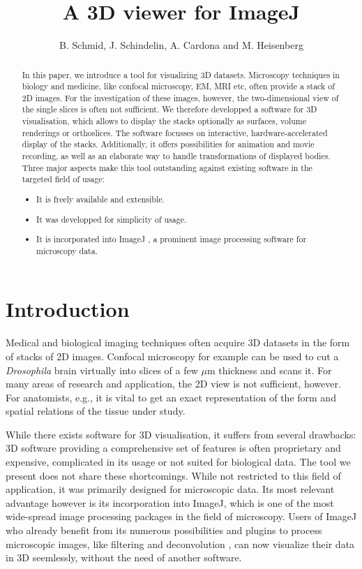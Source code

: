 \documentclass[a4paper,10pt]{article}
\title{A 3D viewer for ImageJ}
\author{B. Schmid, J. Schindelin, A. Cardona and M. Heisenberg}
\begin{document}
\maketitle
\setlength{\parskip}{0.3cm}


\begin{abstract}
In this paper, we introduce a tool for visualizing 3D datasets. Microscopy techniques in biology and medicine, like confocal microscopy, EM, MRI etc, often provide a stack of 2D images. For the investigation of these images, however, the two-dimensional view of the single slices is often not sufficient. We therefore developped a software for 3D visualisation, which allows to display the stacks optionally as surfaces, volume renderings or orthoslices. The software focusses on interactive, hardware-accelerated display of the stacks. Additionally, it offers possibilities for animation and movie recording, as well as an elaborate way to handle transformations of displayed bodies.
Three major aspects make this tool outstanding against existing software in the targeted field of usage:
\begin{itemize}
\item It is freely available and extensible.
\item It was developped for simplicity of usage.
\item It is incorporated into ImageJ \cite{imagej}, a prominent image processing software for microscopy data.
\end{itemize}
\end{abstract}




\section{Introduction}
Medical and biological imaging techniques often acquire 3D datasets in the form of stacks of 2D images. Confocal microscopy for example can be used to cut a \textit{Drosophila} brain virtually into slices of a few $\mu$m thickness and scans it. For many areas of research and application, the 2D view is not sufficient, however. For anatomists, e.g., it is vital to get an exact representation of the form and spatial relations of the tissue under study.

While there exists software for 3D visualisation, it suffers from several drawbacks: 3D software providing a comprehensive set of features is often proprietary and expensive, complicated in its usage or not suited for biological data. The tool we present does not share these shortcomings. While not restricted to this field of application, it was primarily designed for microscopic data. Its most relevant advantage however is its incorporation into ImageJ, which is one of the most wide-spread image processing packages in the field of microscopy. Users of ImageJ who already benefit from its numerous possibilities and plugins to process microscopic images, like filtering and deconvolution \cite{mbf}, can now visualize their data in 3D seemlessly, without the need of another software.
\end{document}
